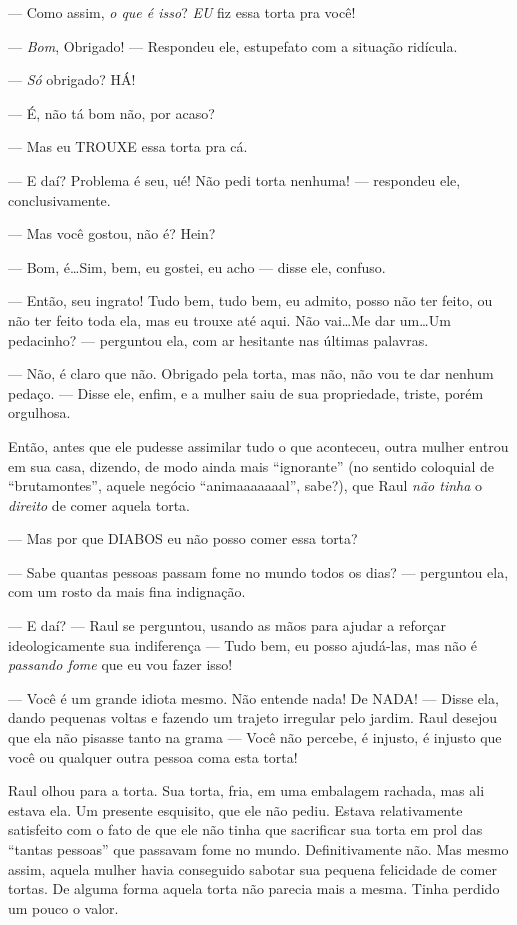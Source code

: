 --- Como assim, \emph{o que é isso}? \emph{EU} fiz essa torta pra você!

--- \emph{Bom}, Obrigado! --- Respondeu ele, estupefato com a situação ridícula.

--- \emph{Só} obrigado? HÁ!

--- É, não tá bom não, por acaso?

--- Mas eu TROUXE essa torta pra cá.

--- E daí? Problema é seu, ué! Não pedi torta nenhuma! --- respondeu ele, conclusivamente.

--- Mas você gostou, não é? Hein?

--- Bom, é\ldots Sim, bem, eu gostei, eu acho --- disse ele, confuso.

--- Então, seu ingrato! Tudo bem, tudo bem, eu admito, posso não ter feito, ou não ter feito toda ela, mas eu trouxe até aqui. Não vai\ldots Me dar um\ldots Um pedacinho? --- perguntou ela, com ar hesitante nas últimas palavras.

--- Não, é claro que não. Obrigado pela torta, mas não, não vou te dar nenhum pedaço. --- Disse ele, enfim, e a mulher saiu de sua propriedade, triste, porém orgulhosa.

Então, antes que ele pudesse assimilar tudo o que aconteceu, outra mulher entrou em sua casa, dizendo, de modo ainda mais ``ignorante'' (no sentido coloquial de “brutamontes”, aquele negócio “animaaaaaaal”, sabe?), que Raul \emph{não tinha} o \emph{direito} de comer aquela torta.

--- Mas por que DIABOS eu não posso comer essa torta?

--- Sabe quantas pessoas passam fome no mundo todos os dias? --- perguntou ela, com um rosto da mais fina indignação.

--- E daí? --- Raul se perguntou, usando as mãos para ajudar a reforçar ideologicamente sua indiferença --- Tudo bem, eu posso ajudá-las, mas não é \emph{passando fome} que eu vou fazer isso!

--- Você é um grande idiota mesmo. Não entende nada! De NADA! --- Disse ela, dando pequenas voltas e fazendo um trajeto irregular pelo jardim. Raul desejou que ela não pisasse tanto na grama --- Você não percebe, é injusto, é injusto que você ou qualquer outra pessoa coma esta torta!

Raul olhou para a torta. Sua torta, fria, em uma embalagem rachada, mas ali estava ela. Um presente esquisito, que ele não pediu. Estava relativamente satisfeito com o fato de que ele não tinha que sacrificar sua torta em prol das ``tantas pessoas'' que passavam fome no mundo. Definitivamente não. Mas mesmo assim, aquela mulher havia conseguido sabotar sua pequena felicidade de comer tortas. De alguma forma aquela torta não parecia mais a mesma. Tinha perdido um pouco o valor.

